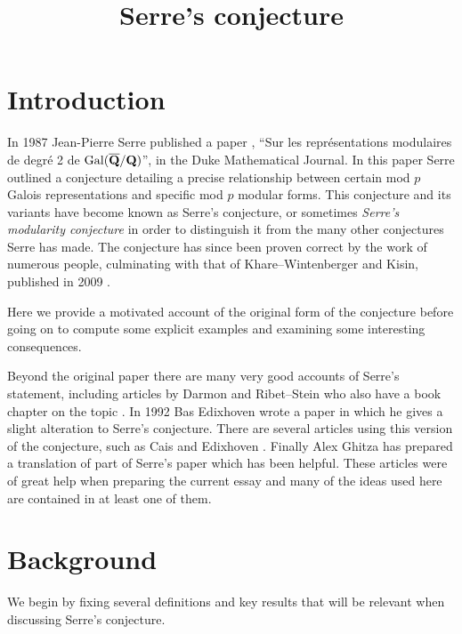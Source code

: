 \documentclass[a4paper,12pt]{article}
\title{Serre's conjecture}
\author{}
\date{}
\begin{document}
\maketitle
\vspace{-45pt}
\tableofcontents
\clearpage


\section{Introduction}
In 1987 Jean-Pierre Serre published a paper \cite{Serre87}, ``Sur les repr\'esentations modulaires de degr\'e 2 de $\operatorname{Gal}(\overline{\mathbf{Q}}/\mathbf{Q})$'', in the Duke Mathematical Journal.
In this paper Serre outlined a conjecture detailing a precise relationship between certain mod $p$ Galois representations and specific mod $p$ modular forms.
This conjecture and its variants have become known as Serre's conjecture, or sometimes \emph{Serre's modularity conjecture} in order to distinguish it from the many other conjectures Serre has made.
The conjecture has since been proven correct by the work of numerous people, culminating with that of Khare--Wintenberger and Kisin, published in 2009 \cite{KWI,KWII,Kisin}.

Here we provide a motivated account of the original form of the conjecture before going on to compute some explicit examples and examining some interesting consequences.

Beyond the original paper there are many very good accounts of Serre's statement, including articles by Darmon \cite{Darmon} and Ribet--Stein \cite{RibetStein} who also have a book chapter on the topic \cite{RibetSteinBook}.
In 1992 Bas Edixhoven wrote a paper \cite{EdixhovenWeight} in which he gives a slight alteration to Serre's conjecture.
There are several articles using this version of the conjecture, such as Cais \cite{Cais} and Edixhoven \cite{Edixhoven}.
Finally Alex Ghitza has prepared a translation of part of Serre's paper \cite{Ghitza} which has been helpful.
These articles were of great help when preparing the current essay and many of the ideas used here are contained in at least one of them.


\section{Background}
We begin by fixing several definitions and key results that will be relevant when discussing Serre's conjecture.
\end{document}
